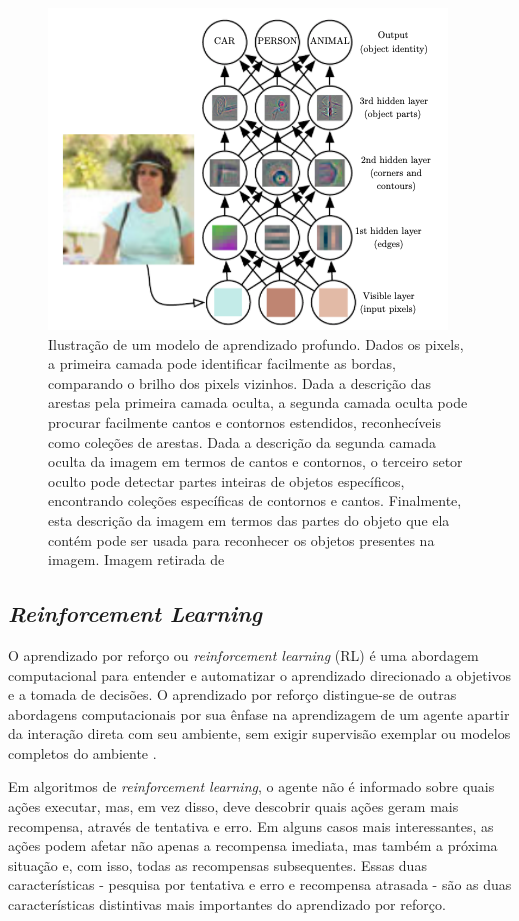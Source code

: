  \begin{figure}[h]
 \centering
 \includegraphics[width=.6 \textwidth]{conteudo/imgs/hierarquia-conceitos-dl.png}
 \caption[Ilustração de um modelo de aprendizado profundo]{Ilustração de um modelo de aprendizado profundo. Dados os pixels, a primeira camada pode identificar facilmente as bordas, comparando o brilho dos pixels vizinhos. Dada a descrição das arestas pela primeira camada oculta, a segunda camada oculta pode procurar facilmente cantos e contornos estendidos, reconhecíveis como coleções de arestas. Dada a descrição da segunda camada oculta da imagem em termos de cantos e contornos, o terceiro setor oculto pode detectar partes inteiras de objetos específicos, encontrando coleções específicas de contornos e cantos. Finalmente, esta descrição da imagem em termos das partes do objeto que ela contém pode ser usada para reconhecer os objetos presentes na imagem. Imagem retirada de \cite{Goodfellow-et-al-2016}}
 \label{hierarquia-conceitos-dl}
\end{figure}

\subsection{\textit{Reinforcement Learning}} %
\label{sub:reinforcement_learning}

O aprendizado por reforço ou \textit{reinforcement learning} (RL) é uma abordagem computacional para entender e automatizar o aprendizado direcionado a objetivos e a tomada de decisões. O aprendizado por reforço distingue-se de outras abordagens computacionais por sua ênfase na aprendizagem de um agente apartir da interação direta com seu ambiente, sem exigir supervisão exemplar ou modelos completos do ambiente \cite{reinforcement-learning-intro-2018}.

Em algoritmos de \textit{reinforcement learning}, o agente não é informado sobre quais ações executar, mas, em vez disso, deve descobrir quais ações geram mais recompensa, através de tentativa e erro. Em alguns casos mais interessantes, as ações podem afetar não apenas a recompensa imediata, mas também a próxima situação e, com isso, todas as recompensas subsequentes. Essas duas características - pesquisa por tentativa e erro e recompensa atrasada - são as duas características distintivas mais importantes do aprendizado por reforço.

